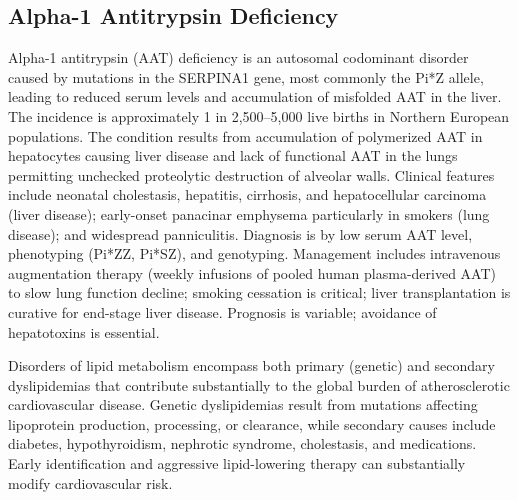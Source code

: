 \subsection{Alpha-1 Antitrypsin Deficiency}
\label{sec:Alpha-1 Antitrypsin Deficiency}
Alpha-1 antitrypsin (AAT) deficiency is an autosomal codominant disorder caused by mutations in the SERPINA1 gene, most commonly the Pi*Z allele, leading to reduced serum levels and accumulation of misfolded AAT in the liver. The incidence is approximately 1 in 2,500--5,000 live births in Northern European populations. The condition results from accumulation of polymerized AAT in hepatocytes causing liver disease and lack of functional AAT in the lungs permitting unchecked proteolytic destruction of alveolar walls. Clinical features include neonatal cholestasis, hepatitis, cirrhosis, and hepatocellular carcinoma (liver disease); early-onset panacinar emphysema particularly in smokers (lung disease); and widespread panniculitis. Diagnosis is by low serum AAT level, phenotyping (Pi*ZZ, Pi*SZ), and genotyping. Management includes intravenous augmentation therapy (weekly infusions of pooled human plasma-derived AAT) to slow lung function decline; smoking cessation is critical; liver transplantation is curative for end-stage liver disease. Prognosis is variable; avoidance of hepatotoxins is essential.

Disorders of lipid metabolism encompass both primary (genetic) and secondary dyslipidemias that contribute substantially to the global burden of atherosclerotic cardiovascular disease. Genetic dyslipidemias result from mutations affecting lipoprotein production, processing, or clearance, while secondary causes include diabetes, hypothyroidism, nephrotic syndrome, cholestasis, and medications. Early identification and aggressive lipid-lowering therapy can substantially modify cardiovascular risk.

